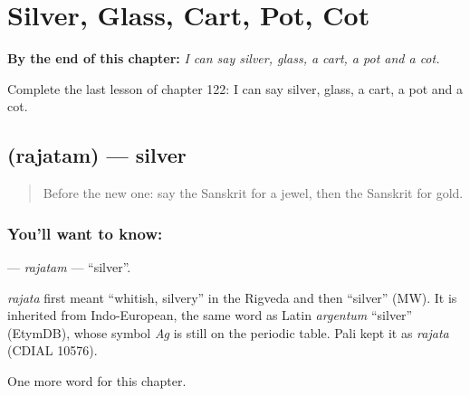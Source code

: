 
\chapter{Silver, Glass, Cart, Pot, Cot}
\label{ch:sa-silver-glass-cart-pot-cot}

\begin{chapteropening}
\textbf{By the end of this chapter:} \emph{I can say silver, glass, a cart, a pot and a cot.}

Complete the last lesson of chapter 122: I can say silver, glass, a cart, a pot and a cot.
\end{chapteropening}

\section[\texorpdfstring{\sk{रजतम्} (rajatam)}{रजतम् (rajatam)}]{ (rajatam) — silver}

\label{lesson:SA-C122-rajatam}



\begin{quote}
Before the new one: say the Sanskrit for a jewel, then the Sanskrit for gold.
\end{quote}

\subsection*{You'll want to know: }
\textbf{} — \emph{rajatam} — \textquotedblleft{}silver\textquotedblright{}.

\begin{cousinweb}
\emph{rajata} first meant \textquotedblleft{}whitish, silvery\textquotedblright{} in the Rigveda and then \textquotedblleft{}silver\textquotedblright{} (MW). It is inherited from Indo-European, the same word as Latin \emph{argentum} \textquotedblleft{}silver\textquotedblright{} (EtymDB), whose symbol \emph{Ag} is still on the periodic table. Pali kept it as \emph{rajata} (CDIAL 10576).
\end{cousinweb}

\begin{grammarlens}[title={What you've built}]
One more word for this chapter.
\end{grammarlens}

